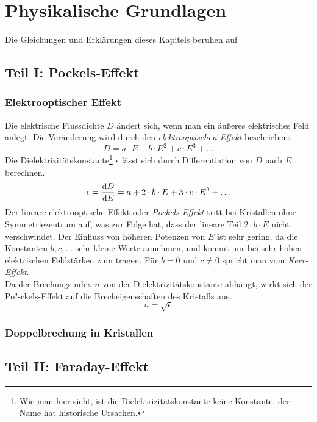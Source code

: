\section{Physikalische Grundlagen}
Die Gleichungen und Erklärungen dieses Kapitels beruhen auf \cite{herrmann}
\subsection{Teil I: Pockels-Effekt}

\subsubsection{Elektrooptischer Effekt}
Die elektrische Flussdichte $D$ ändert sich, wenn man ein äußeres elektrisches Feld anlegt. Die Veränderung wird 
durch den \emph{elektrooptischen Effekt} beschrieben:
\begin{equation}
\label{eq:eoeff}
  D = a \cdot E + b \cdot E^2 + c \cdot E^3 + \ldots
\end{equation}
Die Dielektrizitätskonstante\footnote{Wie man hier sieht, ist die Dielektrizitätskonstante keine Konstante, der Name hat historische Ursachen.} 
$\epsilon$ lässt sich durch Differentiation von $D$ nach $E$ berechnen.
\begin{equation}
\label{eq:dielconst}
  \epsilon = \frac{\mathrm{d} D}{\mathrm{d} E} = a + 2 \cdot b \cdot E + 3 \cdot c \cdot E^2 + \ldots
\end{equation}
Der lineare elektrooptische Effekt oder \emph{Pockels-Effekt} tritt bei Kristallen ohne Symmetriezentrum auf, was zur Folge hat, dass 
der lineare Teil $2 \cdot b \cdot E$ nicht verschwindet. Der Einfluss von höheren Potenzen von $E$ ist sehr gering, da die Konstanten 
$b, c, \ldots$ sehr kleine Werte annehmen, und kommt nur bei sehr hohen elektrischen Feldstärken zum tragen. 
Für $b = 0$ und $c \neq 0$ spricht man vom \emph{Kerr-Effekt}. \\
Da der Brechungsindex $n$ von der Dielektrizitätskonstante abhängt, wirkt sich der Po"-ckels-Effekt auf die Brecheigenschaften des Kristalls aus.
\begin{equation}
  n = \sqrt{\epsilon}
\end{equation}

\subsubsection{Doppelbrechung in Kristallen}

\subsection{Teil II: Faraday-Effekt}
